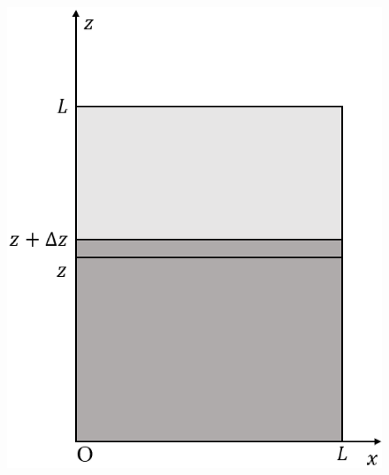 \begin{figure}[H]
\begin{minipage}{.3\columnwidth}
    \includegraphics[width=\columnwidth]{../graphs/jumon_65_2.eps}
    \caption{} 
  \end{minipage}
\end{figure}

